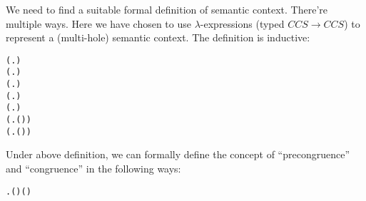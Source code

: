 We need to find a suitable formal definition of semantic
context. There're multiple ways. Here we have chosen to use $\lambda$-expressions (typed
$CCS\rightarrow CCS$) to represent a (multi-hole) semantic
context. The definition is inductive:
\begin{alltt}
 (\HOLTokenLambda{}. )
 (\HOLTokenLambda{}. )
  \HOLSymConst{\HOLTokenImp{}}  (\HOLTokenLambda{}.  )
  \HOLSymConst{\HOLTokenConj{}}   \HOLSymConst{\HOLTokenImp{}}  (\HOLTokenLambda{}.   \HOLSymConst{+}  )
  \HOLSymConst{\HOLTokenConj{}}   \HOLSymConst{\HOLTokenImp{}}  (\HOLTokenLambda{}.   \HOLSymConst{\ensuremath{\parallel}}  )
  \HOLSymConst{\HOLTokenImp{}}  (\HOLTokenLambda{}. \HOLSymConst{\ensuremath{\nu}}  ( ))
  \HOLSymConst{\HOLTokenImp{}}  (\HOLTokenLambda{}.  ( ) )
\end{alltt}

Under above definition, we can formally define the concept of
``precongruence'' and ``congruence'' in the following ways:
\begin{alltt}
  \HOLSymConst{\HOLTokenEquiv{}}
\HOLSymConst{\HOLTokenForall{}}  .   \HOLSymConst{\HOLTokenImp{}}    \HOLSymConst{\HOLTokenImp{}}  ( ) ( )
  \HOLSymConst{\HOLTokenEquiv{}}   \HOLSymConst{\HOLTokenConj{}}  
\end{alltt}

